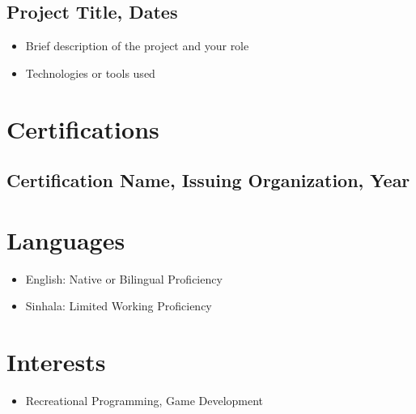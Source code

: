 \documentclass{article}
\begin{document}
\subsection*{Project Title, Dates}
\begin{itemize}
    \item Brief description of the project and your role
    \item Technologies or tools used
\end{itemize}

\section*{Certifications}
\subsection*{Certification Name, Issuing Organization, Year}

\section*{Languages}
\begin{itemize}
    \item English: Native or Bilingual Proficiency
    \item Sinhala: Limited Working Proficiency
\end{itemize}

\section*{Interests}
\begin{itemize}
    \item Recreational Programming, Game Development
\end{itemize}
\end{document}
